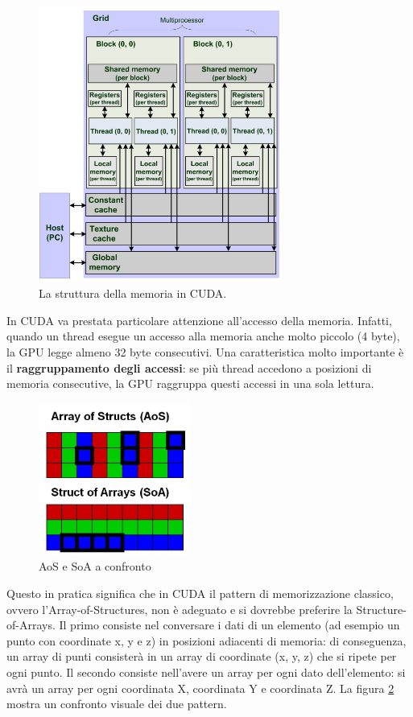 \documentclass[12pt,a4paper,openright,twoside]{report}
\begin{document}
\begin{figure}[h]
    \centering
    \includegraphics[width=8cm]{cuda-memory-hierarchy.jpg}
    \caption{La struttura della memoria in CUDA.}
    \label{img:memory-hierarchy}
\end{figure}

In CUDA va prestata particolare attenzione all'accesso della memoria. Infatti, quando un thread esegue un accesso alla memoria anche molto piccolo (4 byte), la GPU legge almeno 32 byte consecutivi. Una caratteristica molto importante è il \textbf{raggruppamento degli accessi}: se più thread accedono a posizioni di memoria consecutive, la GPU raggruppa questi accessi in una sola lettura.

\begin{figure}
    \centering
    \includegraphics[width=5cm]{aos.jpg}
    \caption{AoS e SoA a confronto}
    \label{img:aos}
\end{figure}

Questo in pratica significa che in CUDA il pattern di memorizzazione classico, ovvero l'Array-of-Structures, non è adeguato e si dovrebbe preferire la Structure-of-Arrays. Il primo consiste nel conversare i dati di un elemento (ad esempio un punto con coordinate x, y e z) in posizioni adiacenti di memoria: di conseguenza, un array di punti consisterà in un array di coordinate (x, y, z) che si ripete per ogni punto. Il secondo consiste nell'avere un array per ogni dato dell'elemento: si avrà un array per ogni coordinata X, coordinata Y e coordinata Z. La figura \ref{img:aos} mostra un confronto visuale dei due pattern.
\end{document}
